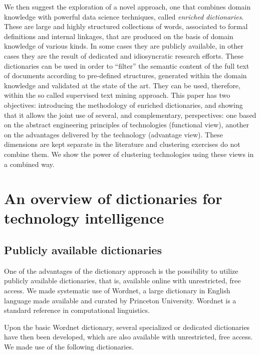 \documentclass[]{book}
\theoremstyle{definition}
\theoremstyle{definition}
\theoremstyle{definition}
\theoremstyle{remark}
\begin{document}
We then suggest the exploration of a novel approach, one that combines
domain knowledge with powerful data science techniques, called
\emph{enriched dictionaries}. These are large and highly structured
collections of words, associated to formal definitions and internal
linkages, that are produced on the basis of domain knowledge of various
kinds. In some cases they are publicly available, in other cases they
are the result of dedicated and idiosyncratic research efforts. These
dictionaries can be used in order to ``filter'' the semantic content of
the full text of documents according to pre-defined structures,
generated within the domain knowledge and validated at the state of the
art. They can be used, therefore, within the so called supervised text
mining approach. This paper has two objectives: introducing the
methodology of enriched dictionaries, and showing that it allows the
joint use of several, and complementary, perspectives: one based on the
abstract engineering principles of technologies (functional view),
another on the advantages delivered by the technology (advantage view).
These dimensions are kept separate in the literature and clustering
exercises do not combine them. We show the power of clustering
technologies using these views in a combined way.

\section{An overview of dictionaries for technology
intelligence}\label{an-overview-of-dictionaries-for-technology-intelligence}

\subsection{Publicly available
dictionaries}\label{publicly-available-dictionaries}

One of the advantages of the dictionary approach is the possibility to
utilize publicly available dictionaries, that is, available online with
unrestricted, free access. We made systematic use of Wordnet, a large
dictionary in English language made available and curated by Princeton
University. Wordnet is a standard reference in computational
linguistics.

Upon the basic Wordnet dictionary, several specialized or dedicated
dictionaries have then been developed, which are also available with
unrestricted, free access. We made use of the following dictionaries.
\end{document}
